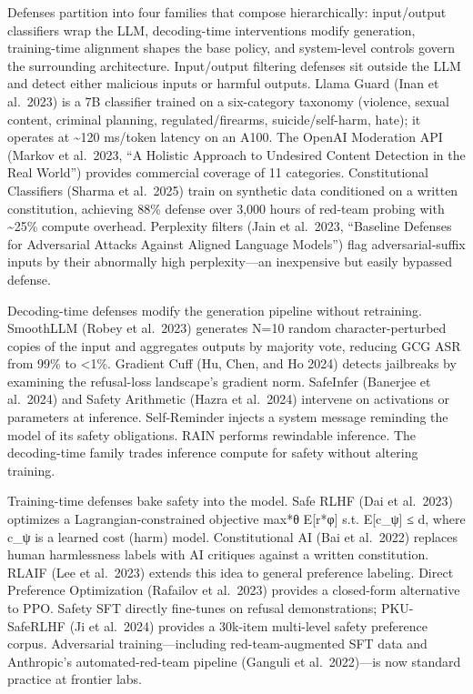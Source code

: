 Defenses partition into four families that compose hierarchically: input/output classifiers wrap the LLM, decoding-time interventions modify generation, training-time alignment shapes the base policy, and system-level controls govern the surrounding architecture. Input/output filtering defenses sit outside the LLM and detect either malicious inputs or harmful outputs. Llama Guard (Inan et al.~2023) is a 7B classifier trained on a six-category taxonomy (violence, sexual content, criminal planning, regulated/firearms, suicide/self-harm, hate); it operates at \textasciitilde120 ms/token latency on an A100. The OpenAI Moderation API (Markov et al.~2023, ``A Holistic Approach to Undesired Content Detection in the Real World'') provides commercial coverage of 11 categories. Constitutional Classifiers (Sharma et al.~2025) train on synthetic data conditioned on a written constitution, achieving 88\% defense over 3,000 hours of red-team probing with \textasciitilde25\% compute overhead. Perplexity filters (Jain et al.~2023, ``Baseline Defenses for Adversarial Attacks Against Aligned Language Models'') flag adversarial-suffix inputs by their abnormally high perplexity---an inexpensive but easily bypassed defense.

Decoding-time defenses modify the generation pipeline without retraining. SmoothLLM (Robey et al.~2023) generates N=10 random character-perturbed copies of the input and aggregates outputs by majority vote, reducing GCG ASR from 99\% to \textless1\%. Gradient Cuff (Hu, Chen, and Ho 2024) detects jailbreaks by examining the refusal-loss landscape's gradient norm. SafeInfer (Banerjee et al.~2024) and Safety Arithmetic (Hazra et al.~2024) intervene on activations or parameters at inference. Self-Reminder injects a system message reminding the model of its safety obligations. RAIN performs rewindable inference. The decoding-time family trades inference compute for safety without altering training.

Training-time defenses bake safety into the model. Safe RLHF (Dai et al.~2023) optimizes a Lagrangian-constrained objective max*θ E{[}r*φ{]} s.t. E{[}c\_ψ{]} ≤ d, where c\_ψ is a learned cost (harm) model. Constitutional AI (Bai et al.~2022) replaces human harmlessness labels with AI critiques against a written constitution. RLAIF (Lee et al.~2023) extends this idea to general preference labeling. Direct Preference Optimization (Rafailov et al.~2023) provides a closed-form alternative to PPO. Safety SFT directly fine-tunes on refusal demonstrations; PKU-SafeRLHF (Ji et al.~2024) provides a 30k-item multi-level safety preference corpus. Adversarial training---including red-team-augmented SFT data and Anthropic's automated-red-team pipeline (Ganguli et al.~2022)---is now standard practice at frontier labs.

